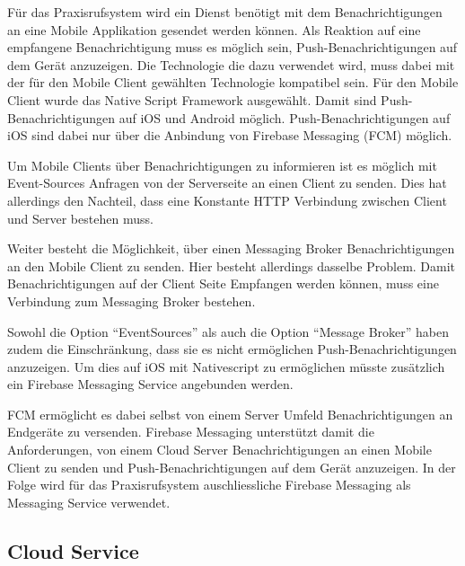 Für das Praxisrufsystem wird ein Dienst benötigt mit dem Benachrichtigungen an eine Mobile Applikation gesendet werden können.
Als Reaktion auf eine empfangene Benachrichtigung muss es möglich sein, Push-Benachrichtigungen auf dem Gerät anzuzeigen.
Die Technologie die dazu verwendet wird, muss dabei mit der für den Mobile Client gewählten Technologie kompatibel sein.
Für den Mobile Client wurde das Native Script Framework ausgewählt.
Damit sind Push-Benachrichtigungen auf iOS und Android möglich.
Push-Benachrichtigungen auf iOS sind dabei nur über die Anbindung von Firebase Messaging (FCM) möglich.\cite{nativescript-push}

Um Mobile Clients über Benachrichtigungen zu informieren ist es möglich mit Event-Sources\cite{event-source} Anfragen von der Serverseite an einen Client zu senden.
Dies hat allerdings den Nachteil, dass eine Konstante HTTP Verbindung zwischen Client und Server bestehen muss.

Weiter besteht die Möglichkeit, über einen Messaging Broker Benachrichtigungen an den Mobile Client zu senden.
Hier besteht allerdings dasselbe Problem.
Damit Benachrichtigungen auf der Client Seite Empfangen werden können, muss eine Verbindung zum Messaging Broker bestehen.

Sowohl die Option ``EventSources'' als auch die Option ``Message Broker'' haben zudem die Einschränkung, dass sie es nicht ermöglichen Push-Benachrichtigungen anzuzeigen.
Um dies auf iOS mit Nativescript zu ermöglichen müsste zusätzlich ein Firebase Messaging Service angebunden werden.

FCM ermöglicht es dabei selbst von einem Server Umfeld Benachrichtigungen an Endgeräte zu versenden.\cite{fcm-java}
Firebase Messaging unterstützt damit die Anforderungen, von einem Cloud Server Benachrichtigungen an einen Mobile Client zu senden und Push-Benachrichtigungen auf dem Gerät anzuzeigen.
In der Folge wird für das Praxisrufsystem auschliessliche Firebase Messaging als Messaging Service verwendet.

\subsection{Cloud Service}\label{subsec:cloud-service2}

